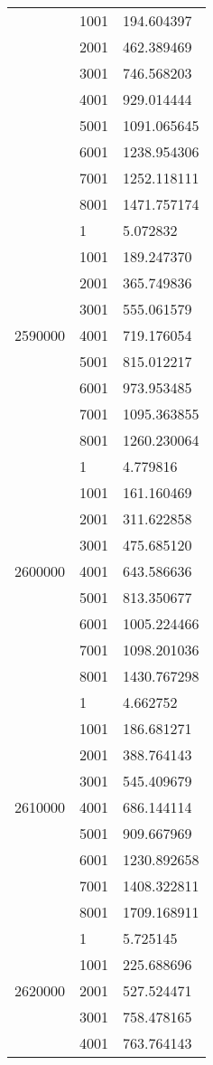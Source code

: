 \begin{table}[htb!]
\begin{tabular}{lll}
 & 1001 & 194.604397 \\
 & 2001 & 462.389469 \\
 & 3001 & 746.568203 \\
 & 4001 & 929.014444 \\
 & 5001 & 1091.065645 \\
 & 6001 & 1238.954306 \\
 & 7001 & 1252.118111 \\
 & 8001 & 1471.757174 \\
\multirow[c]{9}{*}{2590000} & 1 & 5.072832 \\
 & 1001 & 189.247370 \\
 & 2001 & 365.749836 \\
 & 3001 & 555.061579 \\
 & 4001 & 719.176054 \\
 & 5001 & 815.012217 \\
 & 6001 & 973.953485 \\
 & 7001 & 1095.363855 \\
 & 8001 & 1260.230064 \\
\multirow[c]{9}{*}{2600000} & 1 & 4.779816 \\
 & 1001 & 161.160469 \\
 & 2001 & 311.622858 \\
 & 3001 & 475.685120 \\
 & 4001 & 643.586636 \\
 & 5001 & 813.350677 \\
 & 6001 & 1005.224466 \\
 & 7001 & 1098.201036 \\
 & 8001 & 1430.767298 \\
\multirow[c]{9}{*}{2610000} & 1 & 4.662752 \\
 & 1001 & 186.681271 \\
 & 2001 & 388.764143 \\
 & 3001 & 545.409679 \\
 & 4001 & 686.144114 \\
 & 5001 & 909.667969 \\
 & 6001 & 1230.892658 \\
 & 7001 & 1408.322811 \\
 & 8001 & 1709.168911 \\
\multirow[c]{9}{*}{2620000} & 1 & 5.725145 \\
 & 1001 & 225.688696 \\
 & 2001 & 527.524471 \\
 & 3001 & 758.478165 \\
 & 4001 & 763.764143 \\

\end{tabular}
\end{table}
